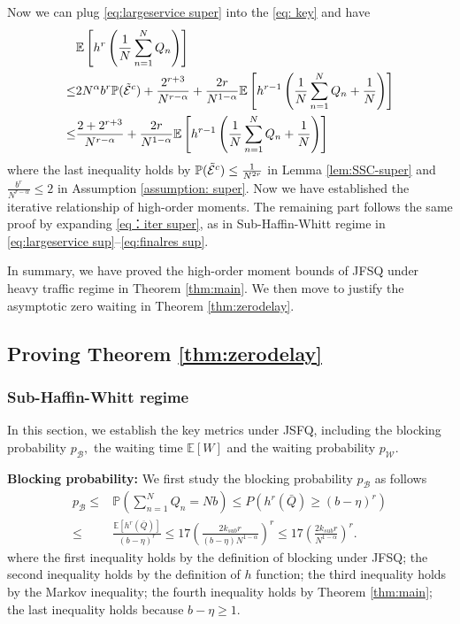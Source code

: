 \documentclass[11pt,oneside,letter]{article}
\begin{document}
Now we can plug \eqref{eq:largeservice super} into the \eqref{eq: key} and have  
\begin{align}
&\mathbb{E}\left[h^r\left(\frac{1}{N}\sum_{n=1}^{N} Q_n\right)\right] \nonumber\\
\leq& 2N^\alpha b^r \mathbb P(\tilde{\cal E}^c) + \frac{2^{r+3}}{ N^{r-\alpha}} + \frac{2r}{N^{1-\alpha}} \mathbb{E}\left[{h^{r-1}}\left(\frac{1}{N}\sum_{n=1}^{N} Q_n +{\frac{1}{N}}\right)\right] \nonumber\\
\leq&\frac{2 + 2^{r+3}}{ N^{r-\alpha}} + \frac{2r}{N^{1-\alpha}} \mathbb{E}\left[{h^{r-1}}\left(\frac{1}{N}\sum_{n=1}^{N} Q_n +{\frac{1}{N}}\right)\right] \label{eq：iter super}
\end{align}
{where the last inequality holds by $\mathbb P(\tilde{\cal  E}^c) \leq \frac{1}{N^{2r}}$ in Lemma \ref{lem:SSC-super}
and $\frac{b^r}{N^{r-\alpha}} \leq 2$ in Assumption \ref{assumption: super}}. Now we have established the iterative relationship of high-order moments. The remaining part follows the same proof by expanding \eqref{eq：iter super}, as in Sub-Haffin-Whitt regime in \eqref{eq:largeservice sup}--\eqref{eq:finalres sup}.  

In summary, we have proved the high-order moment bounds of JFSQ under heavy traffic regime in Theorem \ref{thm:main}. We then move to justify the asymptotic zero waiting in Theorem \ref{thm:zerodelay}. 

\subsection{Proving Theorem \ref{thm:zerodelay}}

\subsubsection*{Sub-Haffin-Whitt regime}
In this section, we establish the key metrics under JSFQ, including the blocking probability $p_{\mathcal B},$ the waiting time $\mathbb E[W]$ and the waiting probability $p_{\mathcal W}.$ 

\vspace{3 pt}
{\bf Blocking probability:} We first study the blocking probability $p_{\mathcal B}$ as follows
\begin{align*}
p_{\mathcal B}
\leq& \mathbb P\left(\sum_{n=1}^N Q_n = Nb\right)  
\leq P\left(h^r(\bar Q) \geq (b-\eta)^r\right) \nonumber\\
\leq& \frac{\mathbb E[h^r(\bar Q)]}{(b-\eta)^r} 
\leq 17\left(\frac{2k_{sub} r}{(b-\eta)N^{1 - \alpha}}\right)^r \leq 17\left(\frac{2k_{sub} r}{N^{1 - \alpha}}\right)^r.
\end{align*}
where the first inequality holds by the definition of blocking under JFSQ; the second inequality holds by the definition of $h$ function; the third inequality holds by the Markov inequality; the fourth inequality holds by Theorem \ref{thm:main};
the last inequality holds because $b-\eta \geq 1.$ 
\end{document}
